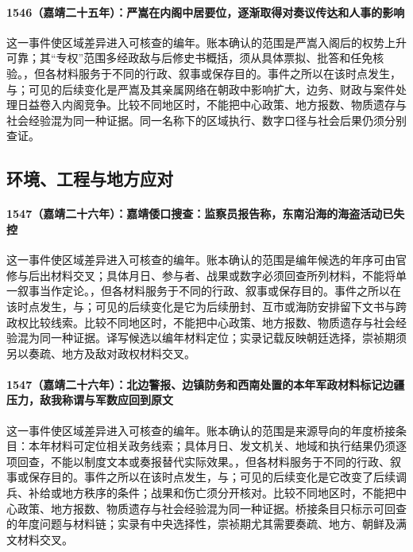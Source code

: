 \paragraph{1546（嘉靖二十五年）：严嵩在内阁中居要位，逐渐取得对奏议传达和人事的影响} 这一事件使区域差异进入可核查的编年。账本确认的范围是严嵩入阁后的权势上升可靠；其“专权”范围多经政敌与后修史书概括，须从具体票拟、批答和任免核验。，但各材料服务于不同的行政、叙事或保存目的。事件之所以在该时点发生，与；可见的后续变化是严嵩及其亲属网络在朝政中影响扩大，边务、财政与案件处理日益卷入内阁竞争。比较不同地区时，不能把中心政策、地方报数、物质遗存与社会经验混为同一种证据。同一名称下的区域执行、数字口径与社会后果仍须分别查证。

\subsection{环境、工程与地方应对}

\paragraph{1547（嘉靖二十六年）：嘉靖倭口搜查：监察员报告称，东南沿海的海盗活动已失控} 这一事件使区域差异进入可核查的编年。账本确认的范围是编年候选的年序可由官修与后出材料交叉；具体月日、参与者、战果或数字必须回查所列材料，不能将单一叙事当作定论。，但各材料服务于不同的行政、叙事或保存目的。事件之所以在该时点发生，与；可见的后续变化是它为后续册封、互市或海防安排留下文书与跨政权比较线索。比较不同地区时，不能把中心政策、地方报数、物质遗存与社会经验混为同一种证据。译写候选以编年材料定位；实录记载反映朝廷选择，崇祯期须另以奏疏、地方及敌对政权材料交叉。

\paragraph{1547（嘉靖二十六年）：北边警报、边镇防务和西南处置的本年军政材料标记边疆压力，敌我称谓与军数应回到原文} 这一事件使区域差异进入可核查的编年。账本确认的范围是来源导向的年度桥接条目：本年材料可定位相关政务线索；具体月日、发文机关、地域和执行结果仍须逐项回查，不能以制度文本或奏报替代实际效果。，但各材料服务于不同的行政、叙事或保存目的。事件之所以在该时点发生，与；可见的后续变化是它改变了后续调兵、补给或地方秩序的条件；战果和伤亡须分开核对。比较不同地区时，不能把中心政策、地方报数、物质遗存与社会经验混为同一种证据。桥接条目只标示可回查的年度问题与材料链；实录有中央选择性，崇祯期尤其需要奏疏、地方、朝鲜及满文材料交叉。

